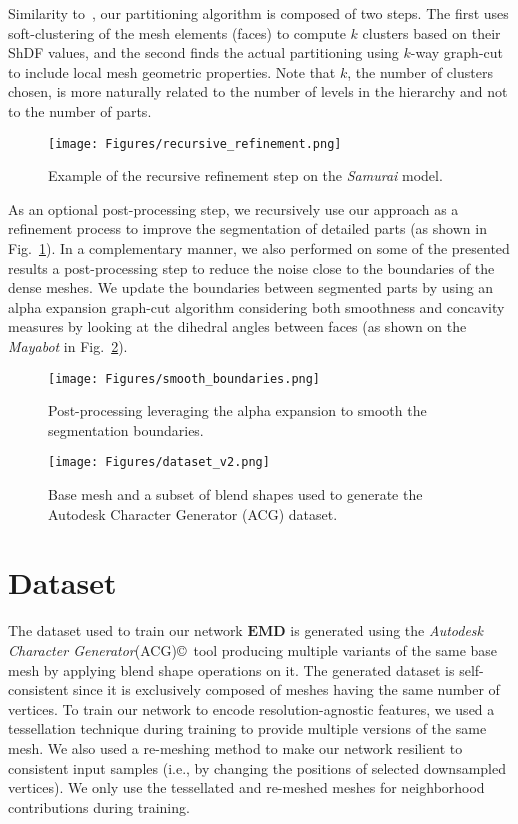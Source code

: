 Similarity to~\cite{shapira2008consistent}, our partitioning algorithm is composed of two steps. The first uses soft-clustering of the mesh elements (faces) to compute $k$ clusters based on their ShDF values, and the second finds the actual partitioning using $k$-way graph-cut to include local mesh geometric properties. Note that $k$, the number of clusters chosen, is more naturally related to the number of levels in the hierarchy and not to the number of parts.

\begin{figure}[h]
  \centering
   \texttt{[image: Figures/recursive\_refinement.png]}
   \caption{Example of the recursive refinement step on the \textsl{Samurai} model.}
   \label{fig:refinement}
\end{figure}

As an optional post-processing step, we recursively use our approach as a refinement process to improve the segmentation of detailed parts (as shown in Fig.~\ref{fig:refinement}). In a complementary manner, we also performed on some of the presented results a post-processing step to reduce the noise close to the boundaries of the dense meshes. We update the boundaries between segmented parts by using an alpha expansion graph-cut algorithm considering both smoothness and concavity measures by looking at the dihedral angles between faces (as shown on the \textsl{Mayabot} in Fig.~\ref{fig:smooth_boundaries}).

\begin{figure}[h]
  \centering
   \texttt{[image: Figures/smooth\_boundaries.png]}
   \caption{Post-processing leveraging the alpha expansion to smooth the segmentation boundaries.} 
   \label{fig:smooth_boundaries}
\end{figure}

\begin{figure}[t]
  \centering
   \texttt{[image: Figures/dataset\_v2.png]}
   \caption{Base mesh and a subset of blend shapes used to generate the Autodesk Character Generator (ACG) dataset.} 
   \label{fig:dataset}
\end{figure}

\section{Dataset}
The dataset used to train our network $\textbf{EMD}$ is generated using the \textsl{Autodesk Character Generator}(ACG)\copyright~tool producing multiple variants of the same base mesh by applying blend shape operations on it. The generated dataset is self-consistent since it is exclusively composed of meshes having the same number of vertices. To train our network to encode resolution-agnostic features, we used a tessellation technique during training to provide multiple versions of the same mesh. We also used a re-meshing method to make our network resilient to consistent input samples (i.e., by changing the positions of selected downsampled vertices). We only use the tessellated and re-meshed meshes for neighborhood contributions during training.

